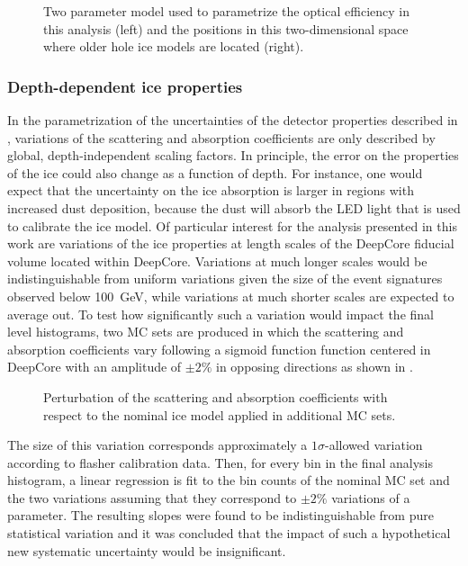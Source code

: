 \begin{figure}
    \centering
    
    
    \caption{Two parameter model used to parametrize the optical efficiency in this analysis (left) and the positions in this two-dimensional space where older hole ice models are located (right).}
    \label{fig:hole-ice-parametrization}
\end{figure}

\subsubsection{Depth-dependent ice properties}
\label{sec:depth-dependent-ice-properties}

In the parametrization of the uncertainties of the detector properties described in , variations of the scattering and absorption coefficients are only described by global, depth-independent scaling factors. In principle, the error on the properties of the ice could also change as a function of depth. For instance, one would expect that the uncertainty on the ice absorption is larger in regions with increased dust deposition, because the dust will absorb the LED light that is used to calibrate the ice model. Of particular interest for the analysis presented in this work are variations of the ice properties at length scales of the DeepCore fiducial volume located within DeepCore. Variations at much longer scales would be indistinguishable from uniform variations given the size of the event signatures observed below 100~GeV, while variations at much shorter scales are expected to average out. To test how significantly such a variation would impact the final level histograms, two MC sets are produced in which the scattering and absorption coefficients vary following a sigmoid function function centered in DeepCore with an amplitude of $\pm 2\%$ in opposing directions as shown in .
\begin{figure}
    \centering
    \caption{Perturbation of the scattering and absorption coefficients with respect to the nominal ice model applied in additional MC sets.}
    \label{fig:step-function-ice-model}
\end{figure}
The size of this variation corresponds approximately a $1\sigma$-allowed variation according to flasher calibration data. Then, for every bin in the final analysis histogram, a linear regression is fit to the bin counts of the nominal MC set and the two variations assuming that they correspond to $\pm 2\%$ variations of a parameter. The resulting slopes were found to be indistinguishable from pure statistical variation and it was concluded that the impact of such a hypothetical new systematic uncertainty would be insignificant.

